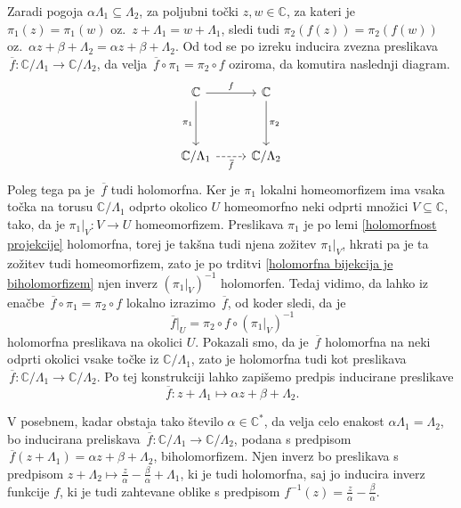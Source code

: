 \documentclass[mat1]{fmfdelo}
\numberwithin{equation}{section}
\newcommand{\C}{\mathbb C}
\newcommand{\CM}{\mathbb C ^*}
\newcommand{\inv}{^{-1}}
\newcommand{\olsi}[1]{\,\overline{\!{#1}}} %
\newcommand{\oz}{oz.\ }
\theoremstyle{definition}
\begin{document}
\begin{zgled*}
    Zaradi pogoja $\alpha\Lambda_1 \subseteq \Lambda_2$, za poljubni točki $z, w \in \C$, za kateri je $\pi_1(z) = \pi_1(w)$ \oz $z + \Lambda_1 = w + \Lambda_1$, sledi tudi $\pi_2(f(z)) = \pi_2(f(w))$ \oz $\alpha z + \beta + \Lambda_2 = \alpha z + \beta + \Lambda_2$.
    Od tod se po izreku \cite[trditev 3.22]{MrcunTop} inducira zvezna preslikava $\olsi{f} : \C/\Lambda_1 \to \C/\Lambda_2$, da velja $\olsi{f} \circ \pi_1 = \pi_2 \circ f$ oziroma, da komutira naslednji diagram.
    \[
        \begin{tikzcd}
            {\mathbb{C}} & {\mathbb{C}} \\
            \\
            {\mathbb{C}/\Lambda_1} & {\mathbb{C}/\Lambda_2}
            \arrow["f", from=1-1, to=1-2]
            \arrow["{\pi_2}", from=1-2, to=3-2]
            \arrow["{\pi_1}"', from=1-1, to=3-1]
            \arrow["{\olsi{f}}"', dashed, from=3-1, to=3-2]
        \end{tikzcd}
    \]
    Poleg tega pa je $\olsi{f}$ tudi holomorfna. Ker je $\pi_1$ lokalni homeomorfizem ima vsaka točka na torusu $\C/\Lambda_1$ odprto okolico $U$ homeomorfno neki odprti množici $V \subseteq \C$, tako, da je $\pi_1|_V : V \to U$ homeomorfizem. Preslikava $\pi_1$ je po lemi \ref{holomorfnost projekcije} holomorfna, torej je takšna tudi njena zožitev $\pi_1|_V$, hkrati pa je ta zožitev tudi homeomorfizem, zato je po trditvi \ref{holomorfna bijekcija je biholomorfizem} njen inverz $(\pi_1|_V)\inv$ holomorfen. Tedaj vidimo, da lahko iz enačbe $\olsi{f} \circ \pi_1 = \pi_2 \circ f$ lokalno izrazimo $\olsi{f}$, od koder sledi, da je 
    \[
        \olsi{f}|_U = \pi_2 \circ f \circ (\pi_1|_V)\inv
    \]
    holomorfna preslikava na okolici $U$. Pokazali smo, da je $\olsi{f}$ holomorfna na neki odprti okolici vsake točke iz $\C/\Lambda_1$, zato je holomorfna tudi kot preslikava $\olsi{f}: \C/\Lambda_1 \to \C/\Lambda_2$. Po tej konstrukciji lahko zapišemo predpis inducirane preslikave
    \[
        \olsi{f}: z + \Lambda_1 \mapsto \alpha z + \beta + \Lambda_2.  
    \]
\end{zgled*}

V posebnem, kadar obstaja tako število $\alpha \in \CM$, da velja celo enakost $\alpha\Lambda_1 = \Lambda_2$, bo inducirana preliskava $\olsi{f} : \C/\Lambda_1 \to \C/\Lambda_2$, podana s predpisom $\olsi{f}(z + \Lambda_1) = \alpha z + \beta + \Lambda_2$, biholomorfizem. Njen inverz bo preslikava s predpisom $z + \Lambda_2 \mapsto \frac{z}{\alpha} - \frac{\beta}{\alpha} + \Lambda_1$, ki je tudi holomorfna, saj jo inducira inverz funkcije $f$, ki je tudi zahtevane oblike s predpisom $f\inv(z) = \frac{z}{\alpha} - \frac{\beta}{\alpha}$.
\end{document}
